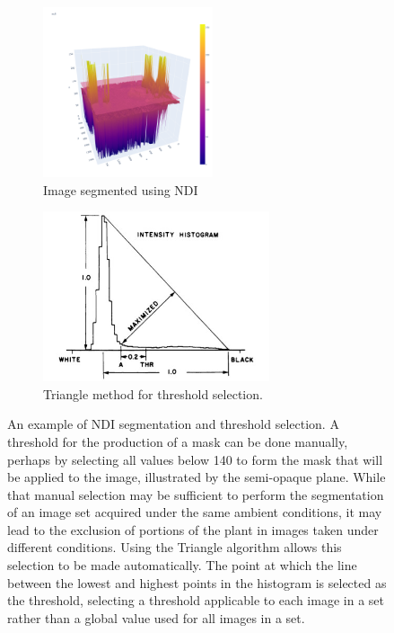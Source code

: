 \documentclass[letterpaper]{article}
\begin{document}
{{\begin{figure}[h!]
	\centering
	\begin{subfigure}[h]{.48\textwidth}
	  \centering
	  \includegraphics[height=5cm]{./figures/ndi-1-of-2.png}
	  \caption{Image segmented using NDI}
	  \label{fig:ndi-1}
	\end{subfigure}
	\hfill
	\begin{subfigure}[h]{.48\textwidth}
	  \centering
	  \includegraphics[height=5cm]{./figures/triangle-algorithm}
	  \caption{Triangle method for threshold selection.}
	  \label{fig:ndi-2}
	\end{subfigure}
	\caption[NDI segmentation and threshold selection]{An example of NDI segmentation and threshold selection. A threshold for the production of a mask can be done manually, perhaps by selecting all values below 140 to form the mask that will be applied to the image, illustrated by the semi-opaque plane. While that manual selection may be sufficient to perform the segmentation of an image set acquired under the same ambient conditions, it may lead to the exclusion of portions of the plant in images taken under different conditions. Using the Triangle algorithm \parencite{Brink1996-xy,Zack1977-yl} allows this selection to be made automatically. The point at which the line between the lowest and highest points in the histogram is selected as the threshold, selecting a threshold applicable to each image in a set rather than a global value used for all images in a set.}
	\label{fig:ndi-segmentation}
\end{figure}

}}
\end{document}
